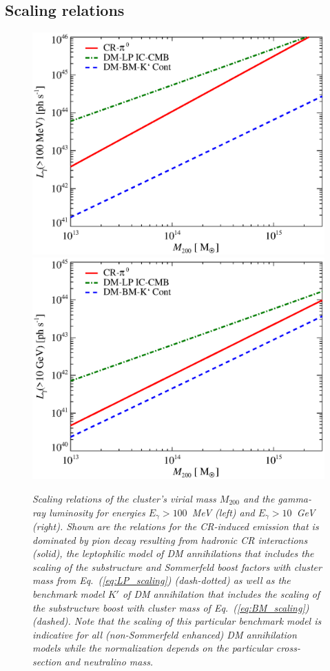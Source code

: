 \documentclass[10pt,aps,pra,reprint,amsmath,amsfonts,amssymb,showpacs,nofootinbib,floatfix]{revtex4-1}
\newcommand{\mvir}{M_{200}}
\begin{document}
\subsection{Scaling relations}

\begin{figure}
  \includegraphics[width=0.99\columnwidth]{figures/MLscaling.100M.eps}
  \includegraphics[width=0.99\columnwidth]{figures/MLscaling.10G.eps}
  \caption{\it Scaling relations of the cluster's virial mass $\mvir$ and the
    gamma-ray luminosity for energies $E_\gamma>100$~MeV (left) and
    $E_\gamma>10$~GeV (right).  Shown are the relations for the CR-induced
    emission that is dominated by pion decay resulting from hadronic CR
    interactions (solid), the leptophilic model of DM annihilations that
    includes the scaling of the substructure and Sommerfeld boost factors with
    cluster mass from Eq.~(\ref{eq:LP_scaling}) (dash-dotted) as well as the
    benchmark model $K'$ of DM annihilation that includes the scaling of the
    substructure boost with cluster mass of Eq.~(\ref{eq:BM_scaling})
    (dashed). Note that the scaling of this particular benchmark model is
    indicative for all (non-Sommerfeld enhanced) DM annihilation models while
    the normalization depends on the particular cross-section and neutralino
    mass.}
\label{fig:lum_mass_scaling}
\end{figure}
\end{document}
